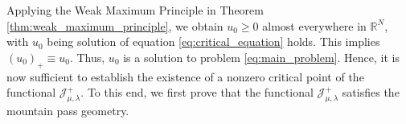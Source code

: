\documentclass[11pt]{article}
\newtheorem{theorem}{Theorem}[section] %
\newcommand{\om} {\Omega}
\newcommand{\X}{\mathcal{X}_0} %
\newcommand{\J}{\mathcal{J}_{\mu,\lambda}} %
\newcommand{\Jplus}{\mathcal{J}_{\mu,\lambda}^{+}} %
\begin{document}

Applying the Weak Maximum Principle in Theorem \ref{thm:weak_maximum_principle}, we obtain \( u_0 \geq 0 \) almost everywhere in \( \mathbb{R}^N \), with $u_0$ being solution of equation \eqref{eq:critical_equation} holds. This implies $(u_0)_+ \equiv u_0$.
Thus, \( u_0 \) is a solution to problem \eqref{eq:main_problem}.
Hence, it is now sufficient to establish the existence of a nonzero critical point of the functional \( \Jplus \). To this end, we first prove that the functional $\J^+$ satisfies the mountain pass geometry.
\end{document}
